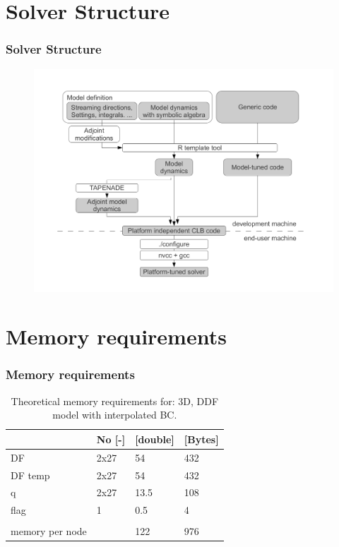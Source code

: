 \documentclass[10pt,handout]{beamer}
\begin{document}
\section{Solver Structure}
\begin{frame}\frametitle{Solver Structure}
\begin{center}
\begin{figure}
\includegraphics[width = \textwidth]{obrazki/TCLB_codeGeneration.png} 
\end{figure}
\end{center}
\end{frame}



\section{Memory requirements}

\begin{frame}\frametitle{Memory requirements}

\begin{table}[]
\centering
\begin{tabular}{l|lll}
                & No {[}-{]} & {[}double{]} & {[}Bytes{]} \\ \hline
DF              & 2x27       & 54           & 432         \\
DF temp         & 2x27       & 54           & 432         \\
q               & 2x27       & 13.5         & 108         \\
flag            & 1          & 0.5          & 4           \\
                &            &              &             \\
memory per node &            & 122          & 976        
\end{tabular}%
\caption{Theoretical memory requirements for: \newline 3D, DDF model with interpolated BC.}
\end{table}

\end{frame}
\end{document}
